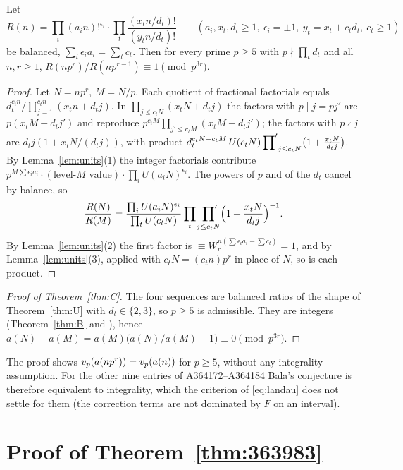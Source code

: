 \documentclass[11pt]{amsart}
\begin{document}
\begin{theorem}\label{thm:U}
Let
\[ R(n)=\prod_i(a_in)!^{\epsilon_i}\cdot\prod_t\frac{(x_tn/d_t)!}{(y_tn/d_t)!}\qquad(a_i,x_t,d_t\ge1,\ \epsilon_i=\pm1,\ y_t=x_t+c_td_t,\ c_t\ge1) \]
be balanced, $\sum_i\epsilon_ia_i=\sum_tc_t$. Then for every prime $p\ge5$ with $p\nmid\prod_td_t$ and all $n,r\ge1$, $R(np^r)/R(np^{r-1})\equiv1\pmod{p^{3r}}$.
\end{theorem}
\begin{proof}
Let $N=np^r$, $M=N/p$. Each quotient of fractional factorials equals $d_t^{c_tn}/\prod_{j=1}^{c_tn}(x_tn+d_tj)$. In $\prod_{j\le c_tN}(x_tN+d_tj)$ the factors with $p\mid j=pj'$ are $p(x_tM+d_tj')$ and reproduce $p^{c_tM}\prod_{j'\le c_tM}(x_tM+d_tj')$; the factors with $p\nmid j$ are $d_tj(1+x_tN/(d_tj))$, with product $d_t^{c_tN-c_tM}\,U(c_tN)\sideset{}{'}\prod_{j\le c_tN}\bigl(1+\frac{x_tN}{d_tj}\bigr)$. By Lemma~\ref{lem:units}(1) the integer factorials contribute $p^{M\sum\epsilon_ia_i}\cdot(\text{level-}M\text{ value})\cdot\prod_iU(a_iN)^{\epsilon_i}$. The powers of $p$ and of the $d_t$ cancel by balance, so
\[ \frac{R(N)}{R(M)}=\frac{\prod_iU(a_iN)^{\epsilon_i}}{\prod_tU(c_tN)}\prod_t\sideset{}{'}\prod_{j\le c_tN}\Bigl(1+\frac{x_tN}{d_tj}\Bigr)^{-1}. \]
By Lemma~\ref{lem:units}(2) the first factor is $\equiv W_r^{n(\sum\epsilon_ia_i-\sum c_t)}=1$, and by Lemma~\ref{lem:units}(3), applied with $c_tN=(c_tn)p^r$ in place of $N$, so is each product.
\end{proof}

\begin{proof}[Proof of Theorem~\ref{thm:C}]
The four sequences are balanced ratios of the shape of Theorem~\ref{thm:U} with $d_t\in\{2,3\}$, so $p\ge5$ is admissible. They are integers (Theorem~\ref{thm:B} and \cite{radcliffe2026}), hence $a(N)-a(M)=a(M)\bigl(a(N)/a(M)-1\bigr)\equiv0\pmod{p^{3r}}$.
\end{proof}

\begin{remark}
The proof shows $v_p(a(np^r))=v_p(a(n))$ for $p\ge5$, without any integrality assumption. For the other nine entries of A364172--A364184 Bala's conjecture is therefore equivalent to integrality, which the criterion of \eqref{eq:landau} does not settle for them (the correction terms are not dominated by $F$ on an interval).
\end{remark}

\section{Proof of Theorem~\ref{thm:363983}}\label{sec:363983}
\end{document}
